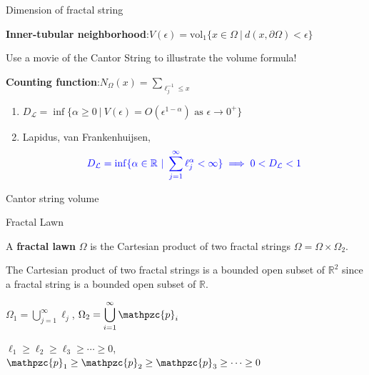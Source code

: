 \documentclass{if-beamer}
\newcommand{\R}{\mathbb{R}}
\newcommand{\p}{\mathpzc{p}}
\newcommand{\Om}{\Omega}
\begin{document}
\begin{frame}{Dimension of fractal string}

{\bf Inner-tubular neighborhood}:\quad $V(\epsilon) = \text{vol}_1\{x \in \Omega\ |\ d(x,\partial\Omega) < \epsilon\}$

\pause
\vspace{.2 in}

{\color{red} Use a movie of the Cantor String to illustrate the volume formula!}

\pause
\vspace{.2 in}

{\bf Counting function}:\quad $N_{\Omega}(x) = \sum_{\ell_j^{-1} \leq x}$





\begin{enumerate}
\item[] $D_{\mathcal{L}} = \inf\{\alpha \geq 0\ |\ V(\epsilon) = O(\epsilon^{1 - \alpha})\text{ as }\epsilon \to 0^+\}$ \\

\pause
\vspace{.2 in}

\item[] Lapidus, van Frankenhuijsen, \cite{lapidus2000fractal, lapidus2003complex, lapidus2012fractal}
\[ {\color{blue} D_\mathcal{L} = \inf\{\alpha \in \mathbb{R}\ |\ \sum_{j = 1}^\infty \ell_j^{\alpha} < \infty\} \implies 0 < D_{\mathcal{L}} < 1} \]
\end{enumerate}


\end{frame}

\begin{frame}{Cantor string volume}
	\begin{center}
	\end{center}
\end{frame}

\begin{frame}{Fractal Lawn}

	\begin{definition}
	A {\bf fractal lawn} $\Om$ is the Cartesian product of two fractal strings $\Om=\Om\times\Om_2$.
	\end{definition}
	
	\pause
	\vspace{.2 in}
	
	The Cartesian product of two fractal strings is a bounded open subset of $\R^2$ since a fractal string is a bounded open subset of $\R$.
	\pause
	\vspace{.2 in}
	
$\Om_1 = \displaystyle\bigcup_{j = 1}^\infty\ell_j$, \quad $\Om_2 = \displaystyle\bigcup_{i = 1}^\infty \p_i$
\pause
\vspace{.2 in}

$\ell_1 \geq \ell_2 \geq \ell_3 \geq \cdots \geq 0$, \quad $\p_1 \geq \p_2 \geq \p_3 \geq \cdots \geq 0$

\end{frame}
\end{document}
